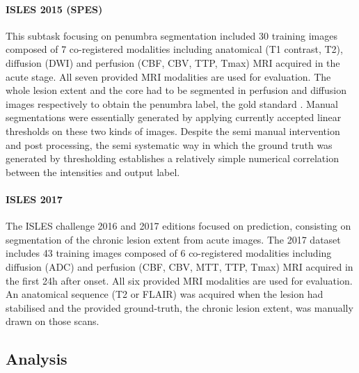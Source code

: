 \documentclass[letterpaper,final,authoryear,3p,times,twocolumn]{elsarticle}
\begin{document}
\paragraph{ISLES 2015 (SPES)} This subtask focusing on penumbra segmentation included 30 training images composed of 7 co-registered modalities including anatomical (T1 contrast, T2), diffusion (DWI) and perfusion (CBF, CBV, TTP, Tmax) MRI acquired in the acute stage. All seven provided MRI modalities are used for evaluation. The whole lesion extent and the core had to be segmented in perfusion and diffusion images respectively to obtain the penumbra label, the gold standard \citep{Maier2017isles}. Manual segmentations were essentially generated by applying currently accepted linear thresholds on these two kinds of images. Despite the semi manual intervention and post processing, the semi systematic way in which the ground truth was generated by thresholding establishes a relatively simple numerical correlation between the intensities and output label.

\paragraph{ISLES 2017} The ISLES challenge 2016 and 2017 editions focused on prediction, consisting on segmentation of the chronic lesion extent from acute images. The 2017 dataset includes 43 training images composed of 6 co-registered modalities including diffusion (ADC) and perfusion (CBF, CBV, MTT, TTP, Tmax) MRI acquired in the first 24h after onset. All six provided MRI modalities are used for evaluation. An anatomical sequence (T2 or FLAIR) was acquired when the lesion had stabilised and the provided ground-truth, the chronic lesion extent, was manually drawn on those scans.

\subsection{Analysis}
\end{document}
